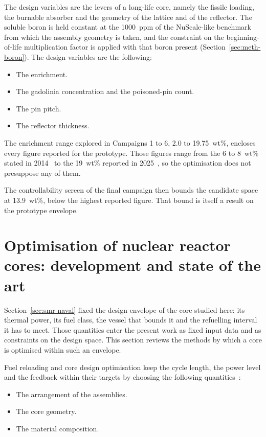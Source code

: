 The design variables are the levers of a long-life core, namely the
fissile loading, the burnable absorber and the geometry of the lattice
and of the reflector. The soluble boron is held constant at the
1000~ppm of the NuScale-like benchmark from which the assembly geometry
is taken, and the constraint on the beginning-of-life multiplication
factor is applied with that boron present
(Section~\ref{sec:meth-boron}). The design variables are the following:

\begin{itemize}
  \item The enrichment.

  \item The gadolinia concentration and the poisoned-pin count.

  \item The pin pitch.

  \item The reflector thickness.
\end{itemize}

The enrichment range explored in Campaigns 1 to 6, 2.0 to 19.75~wt\%,
encloses every figure reported for the prototype. Those figures range
from the 6 to 8~wt\% stated in 2014~\cite{dinizcosta_2017} to the
19~wt\% reported in 2025~\cite{vasconcelos_fapesp_2025}, so the
optimisation does not presuppose any of them.

The controllability screen of the final campaign then bounds the
candidate space at 13.9~wt\%, below the highest reported figure. That
bound is itself a result on the prototype envelope.

\section{Optimisation of nuclear reactor cores: development and state
of the art}
\label{sec:lit-opt}

Section~\ref{sec:smr-naval} fixed the design envelope of the core
studied here: its thermal power, its fuel class, the vessel that bounds
it and the refuelling interval it has to meet. Those quantities enter
the present work as fixed input data and as constraints on the design
space. This section reviews the methods by which a core is optimised
within such an envelope.

Fuel reloading and core design optimisation keep the cycle length, the
power level and the feedback within their targets by choosing the
following quantities~\cite{stewart_2021}:

\begin{itemize}
  \item The arrangement of the assemblies.

  \item The core geometry.

  \item The material composition.
\end{itemize}

